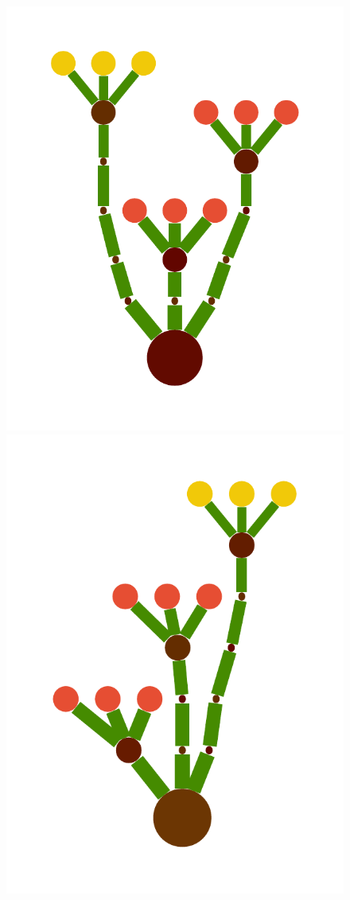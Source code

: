 \documentclass[a4paper,10pt]{article}
\begin{document}
\begin{figure}[b]
\begin{center}
\includegraphics[scale=.26]{../figures/vector/1-tree-4.pdf}
\includegraphics[scale=.26]{../figures/vector/1-tree-6.pdf}

\end{center}
\end{figure}
\end{document}
